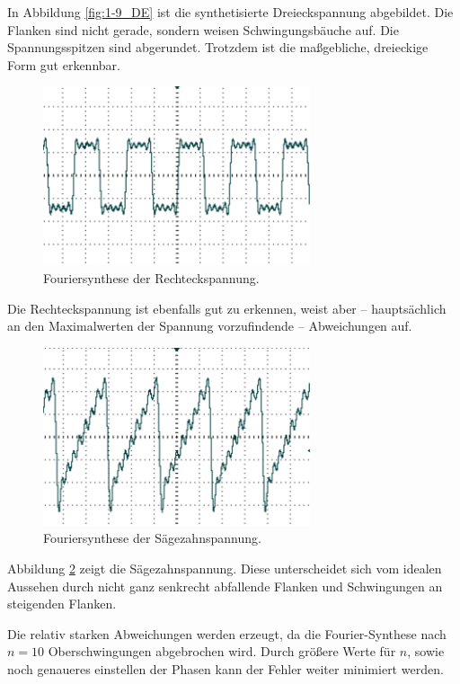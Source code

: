 In Abbildung \ref{fig:1-9_DE} ist die synthetisierte Dreieckspannung abgebildet. Die Flanken sind nicht gerade, sondern weisen Schwingungsbäuche auf. Die Spannungsspitzen sind abgerundet. Trotzdem ist die maßgebliche, dreieckige Form gut erkennbar.

\begin{figure}
	\centering
		\includegraphics[width=0.7\textwidth]{Bilder/1-9_RE.pdf}		
\caption{Fouriersynthese der Rechteckspannung.}
	\label{fig:1-9_RE}
\end{figure}
Die Rechteckspannung ist ebenfalls gut zu erkennen, weist aber -- hauptsächlich an den Maximalwerten der Spannung vorzufindende -- Abweichungen auf. 

\begin{figure}
	\centering
		\includegraphics[width=0.7\textwidth]{Bilder/1-9_SZ.pdf}		
\caption{Fouriersynthese der Sägezahnspannung.}
	\label{fig:1-9_SZ}
\end{figure}
Abbildung \ref{fig:1-9_SZ} zeigt die Sägezahnspannung. Diese unterscheidet sich vom idealen Aussehen durch nicht ganz senkrecht abfallende Flanken und Schwingungen an steigenden Flanken.

Die relativ starken Abweichungen werden erzeugt, da die Fourier-Synthese nach $n=10$ Oberschwingungen abgebrochen wird. Durch größere Werte für $n$, sowie noch genaueres einstellen der Phasen kann der Fehler weiter minimiert werden.
